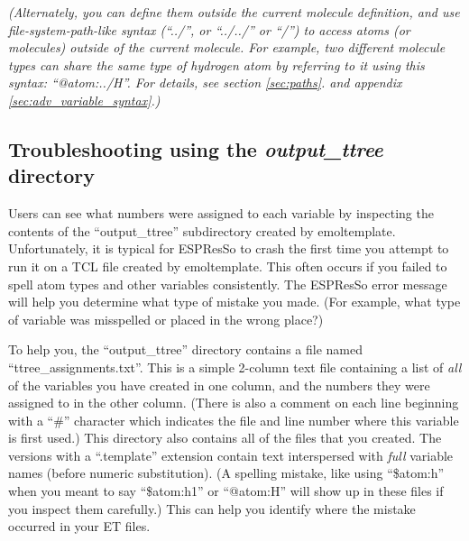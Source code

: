 \documentclass[11pt]{article}
\begin{document}
\textit{(Alternately, you can define them outside the current molecule definition,
and use file-system-path-like syntax 
(``../'', or ``../../'' or ``/'')
to access atoms (or molecules) outside of the current molecule.
For example, two different molecule types can share the same type of
hydrogen atom by referring to it using this syntax: ``@atom:../H''.
For details, see
section \ref{sec:paths}.
and appendix \ref{sec:adv_variable_syntax}.)
}



\subsection{Troubleshooting using the \textit{output\_ttree} directory}
\label{sec:output_ttree}
Users can see what numbers were assigned to each variable 
by inspecting the contents of the ``output\_ttree'' subdirectory
created by emoltemplate. 
Unfortunately, it is typical for ESPResSo to crash the first time you 
attempt to run it on a TCL file created by emoltemplate.  This often occurs 
if you failed to spell atom types and other variables consistently.
The ESPResSo error message 
will help you determine what type of mistake you made.
(For example, what type of variable was misspelled or placed in the wrong place?)

To help you, the ``output\_ttree'' directory contains a file named 
``ttree\_assignments.txt''. 
This is a simple 2-column text file containing a list of \textit{all} 
of the variables you have created in one column, and the numbers they
were assigned to in the other column.
(There is also a comment on each line beginning with a ``\#'' character which
indicates the file and line number where this variable is first used.)
This directory also contains all of the files that you created. 
The versions with a ``.template'' extension contain text
interspersed with \textit{full} variable names (before numeric substitution).
(A spelling mistake, like using ``\$atom:h'' when you meant to say ``\$atom:h1''
or ``@atom:H'' will show up in these files if you inspect them carefully.)
This can help you identify where the mistake occurred
in your ET files.
\end{document}
